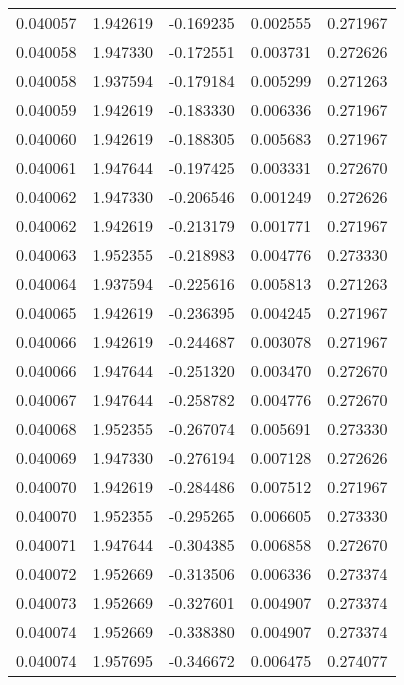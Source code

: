 \begin{tabular}{lrrrr}
0.040057    &  1.942619 & -0.169235 &  0.002555 &             0.271967 \\
0.040058    &  1.947330 & -0.172551 &  0.003731 &             0.272626 \\
0.040058    &  1.937594 & -0.179184 &  0.005299 &             0.271263 \\
0.040059    &  1.942619 & -0.183330 &  0.006336 &             0.271967 \\
0.040060    &  1.942619 & -0.188305 &  0.005683 &             0.271967 \\
0.040061    &  1.947644 & -0.197425 &  0.003331 &             0.272670 \\
0.040062    &  1.947330 & -0.206546 &  0.001249 &             0.272626 \\
0.040062    &  1.942619 & -0.213179 &  0.001771 &             0.271967 \\
0.040063    &  1.952355 & -0.218983 &  0.004776 &             0.273330 \\
0.040064    &  1.937594 & -0.225616 &  0.005813 &             0.271263 \\
0.040065    &  1.942619 & -0.236395 &  0.004245 &             0.271967 \\
0.040066    &  1.942619 & -0.244687 &  0.003078 &             0.271967 \\
0.040066    &  1.947644 & -0.251320 &  0.003470 &             0.272670 \\
0.040067    &  1.947644 & -0.258782 &  0.004776 &             0.272670 \\
0.040068    &  1.952355 & -0.267074 &  0.005691 &             0.273330 \\
0.040069    &  1.947330 & -0.276194 &  0.007128 &             0.272626 \\
0.040070    &  1.942619 & -0.284486 &  0.007512 &             0.271967 \\
0.040070    &  1.952355 & -0.295265 &  0.006605 &             0.273330 \\
0.040071    &  1.947644 & -0.304385 &  0.006858 &             0.272670 \\
0.040072    &  1.952669 & -0.313506 &  0.006336 &             0.273374 \\
0.040073    &  1.952669 & -0.327601 &  0.004907 &             0.273374 \\
0.040074    &  1.952669 & -0.338380 &  0.004907 &             0.273374 \\
0.040074    &  1.957695 & -0.346672 &  0.006475 &             0.274077 \\

\end{tabular}
